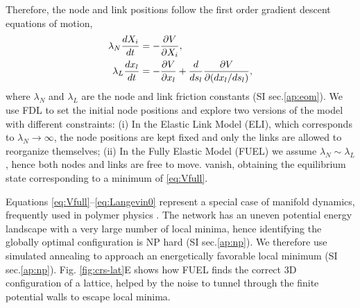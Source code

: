 \documentclass[nofootinbib,preprint,floatfix,titlepage,superscriptaddress]{revtex4} %
\begin{document}
Therefore, the node and link positions follow the first order gradient descent equations of motion, 
\begin{align}
    \lambda_N {dX_i\over dt} &= -{\ro V \over \ro X_i} %
    \label{eq:nodes},\\
    \lambda_L {dx_l \over dt} & =  -{\ro V \over \ro x_l} + {d\over ds_l} {\ro V \over \ro (dx_l /ds_l)}   \label{eq:Langevin0},
\end{align}
where $\lambda_N$ and $\lambda_L$ are the node and link friction constants (SI sec.\ref{ap:eom}). 
We use FDL to set the initial node positions and explore two versions of the model with different constraints: 
(i) In the Elastic Link Model (ELI), which corresponds to $\lambda_N\to \infty$, the node positions are kept fixed and only the links are allowed to reorganize themselves; 
(ii) In the Fully Elastic Model (FUEL) we assume $\lambda_N \sim \lambda_L$, hence both nodes and links are free to move. 
vanish, obtaining the equilibrium state corresponding to a minimum of \eqref{eq:Vfull}.

Equations \eqref{eq:Vfull}--\eqref{eq:Langevin0} represent a special case of manifold dynamics, frequently used in polymer physics \cite{mezard1991replica}. 
The network has an uneven potential energy landscape \cite{parisi2002physical} with a very large number of local minima, hence identifying the globally optimal configuration is NP hard (SI sec.\ref{ap:np}).
We therefore use simulated annealing \cite{hwang1988simulated} to approach an energetically favorable local minimum (SI sec.\ref{ap:np}). 
Fig. \ref{fig:crs-lat}E shows how FUEL finds the correct 3D configuration of a lattice, %
helped by the noise to tunnel through the finite potential walls to escape local minima. 
\end{document}

